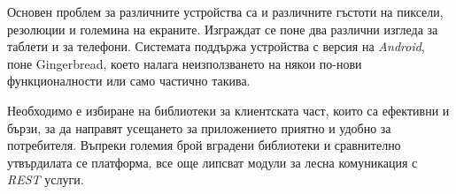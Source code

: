 	Основен проблем за различните устройства са и различните гъстоти на пиксели, резолюции и големина на екраните. Изграждат се поне два различни изгледа за таблети и за телефони. Системата поддържа устройства с версия на \emph{Android}, поне Gingerbread, което налага неизползването на някои по-нови функционалности или само частично такива.
	
	Необходимо е избиране на библиотеки за клиентската част, които са ефективни и бързи, за да направят усещането за приложението приятно и удобно за потребителя. Въпреки големия брой вградени библиотеки и сравнително утвърдилата се платформа, все още липсват модули за лесна комуникация с \emph{REST} услуги.
